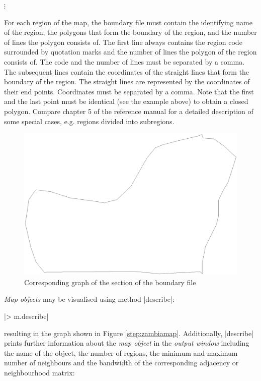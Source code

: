 \hspace{1cm} $\vdots$

\normalsize

\vspace{0.3cm}

For each region of the map, the boundary file must contain the identifying name of the region, the polygons that form the
boundary of the region, and the number of lines the polygon consists of. The first line always contains the region code
surrounded by quotation marks and the number of lines the polygon of the region consists of. The code and the number of lines
must be separated by a comma. The subsequent lines contain the coordinates of the straight lines that form the boundary of the
region. The straight lines are represented by the coordinates of their end points. Coordinates must be separated by a comma.
Note that the first and the last point must be identical (see the example above) to obtain a closed polygon. Compare chapter 5
of the reference manual for a detailed description of some special cases, e.g. regions divided into subregions.

\begin{figure}[h]
\centering
\includegraphics [scale=0.3]{grafiken/zambia52.ps}
\caption{\label{step:zambia52} Corresponding graph of the section of
the boundary file}
\end{figure}

{\it Map objects} may be visualised using method |describe|:

|> m.describe|

resulting in the graph shown in Figure \ref{step:zambiamap}. Additionally, |describe| prints further information about the {\it
map object} in the {\it output window} including the name of the object, the number of regions, the minimum and maximum number
of neighbours and the bandwidth of the corresponding adjacency or neighbourhood matrix:

